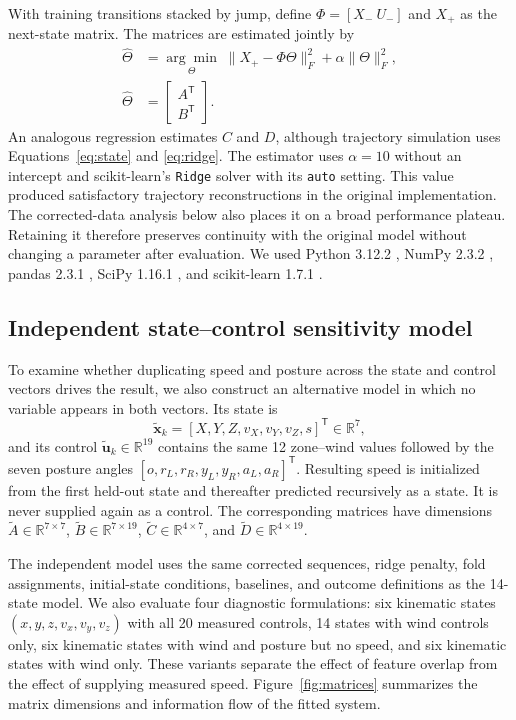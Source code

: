 \documentclass[11pt,twoside,a4paper]{article}
\begin{document}
With training transitions stacked by jump, define $\Phi=[X_-\ U_-]$ and $X_+$ as the next-state matrix. The matrices are estimated jointly by
\begin{align}
\widehat{\Theta}&=\underset{\Theta}{\arg\min}\;
\lVert X_+-\Phi\Theta\rVert_F^2+\alpha\lVert\Theta\rVert_F^2,
\label{eq:ridge}\\
\widehat{\Theta}&=\begin{bmatrix}A^{\mathsf T}\\B^{\mathsf T}\end{bmatrix}.
\end{align}
An analogous regression estimates $C$ and $D$, although trajectory simulation uses Equations~\eqref{eq:state} and \eqref{eq:ridge}. The estimator uses $\alpha=10$ without an intercept and scikit-learn's \texttt{Ridge} solver with its \texttt{auto} setting. This value produced satisfactory trajectory reconstructions in the original implementation. The corrected-data analysis below also places it on a broad performance plateau. Retaining it therefore preserves continuity with the original model without changing a parameter after evaluation. We used Python 3.12.2 \cite{python3122}, NumPy 2.3.2 \cite{harris2020numpy}, pandas 2.3.1 \cite{pandas231}, SciPy 1.16.1 \cite{virtanen2020scipy}, and scikit-learn 1.7.1 \cite{pedregosa2011scikit}.

\subsection{Independent state--control sensitivity model}\label{sec:independent}

To examine whether duplicating speed and posture across the state and control vectors drives the result, we also construct an alternative model in which no variable appears in both vectors. Its state is
\[
\widetilde{\mathbf{x}}_k=[X,Y,Z,v_X,v_Y,v_Z,s]^{\mathsf T}\in\mathbb{R}^{7},
\]
and its control $\widetilde{\mathbf{u}}_k\in\mathbb{R}^{19}$ contains the same 12 zone--wind values followed by the seven posture angles $[o,r_L,r_R,y_L,y_R,a_L,a_R]^{\mathsf T}$. Resulting speed is initialized from the first held-out state and thereafter predicted recursively as a state. It is never supplied again as a control. The corresponding matrices have dimensions $\widetilde A\in\mathbb{R}^{7\times7}$, $\widetilde B\in\mathbb{R}^{7\times19}$, $\widetilde C\in\mathbb{R}^{4\times7}$, and $\widetilde D\in\mathbb{R}^{4\times19}$.

The independent model uses the same corrected sequences, ridge penalty, fold assignments, initial-state conditions, baselines, and outcome definitions as the 14-state model. We also evaluate four diagnostic formulations: six kinematic states $(x, y, z, v_x, v_y, v_z)$ with all 20 measured controls, 14 states with wind controls only, six kinematic states with wind and posture but no speed, and six kinematic states with wind only. These variants separate the effect of feature overlap from the effect of supplying measured speed. Figure~\ref{fig:matrices} summarizes the matrix dimensions and information flow of the fitted system.
\end{document}
